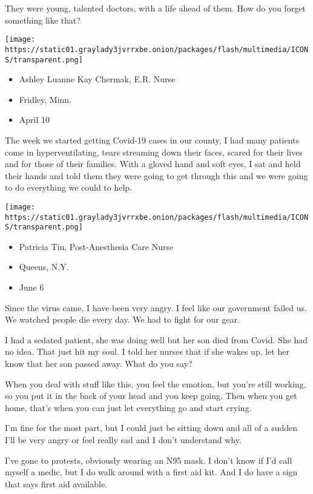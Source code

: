 They were young, talented doctors, with a life ahead of them. How do you
forget something like that?

\texttt{[image: https://static01.graylady3jvrrxbe.onion/packages/flash/multimedia/ICONS/transparent.png]}

\begin{itemize}
\tightlist
\item
  Ashley Luanne Kay Chermak, E.R. Nurse
\item
  Fridley, Minn.
\item
  April 10
\end{itemize}

The week we started getting Covid-19 cases in our county, I had many
patients come in hyperventilating, tears streaming down their faces,
scared for their lives and for those of their families. With a gloved
hand and soft eyes, I sat and held their hands and told them they were
going to get through this and we were going to do everything we could to
help.

\texttt{[image: https://static01.graylady3jvrrxbe.onion/packages/flash/multimedia/ICONS/transparent.png]}

\begin{itemize}
\tightlist
\item
  Patricia Tiu, Post-Anesthesia Care Nurse
\item
  Queens, N.Y.
\item
  June 6
\end{itemize}

Since the virus came, I have been very angry. I feel like our government
failed us. We watched people die every day. We had to fight for our
gear.

I had a sedated patient, she was doing well but her son died from Covid.
She had no idea. That just hit my soul. I told her nurses that if she
wakes up, let her know that her son passed away. What do you say?

When you deal with stuff like this, you feel the emotion, but you're
still working, so you put it in the back of your head and you keep
going. Then when you get home, that's when you can just let everything
go and start crying.

I'm fine for the most part, but I could just be sitting down and all of
a sudden I'll be very angry or feel really sad and I don't understand
why.

I've gone to protests, obviously wearing an N95 mask. I don't know if
I'd call myself a medic, but I do walk around with a first aid kit. And
I do have a sign that says first aid available.

